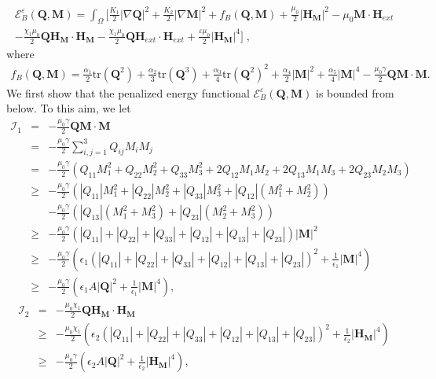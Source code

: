 \documentclass{article}
\def\Qvec{\mathbf{Q}}
\def \Mvec{\mathbf{M}}
\def\Hvec{\mathbf{H}}
\begin{document}
\begin{eqnarray}\label{penalized_energy}
\mathcal{E}^{\varepsilon}_B\left(\Qvec, \Mvec\right) = \int_{\Omega} \biggl[\frac{K_1}{2}|\nabla \Qvec|^2 + \frac{K_2}{2}|\nabla \Mvec|^2 + f_B\left(\Qvec, \Mvec\right) + \frac{\mu_0}{2}|\Hvec_{\Mvec}|^2 - \mu_0\Mvec\cdot \Hvec_{ext}\nonumber\\
- \frac{\chi_1\mu_0}{2}\Qvec\Hvec_{\Mvec}\cdot\Hvec_{\Mvec} - \frac{\chi_1\mu_0}{2}\Qvec\Hvec_{ext}\cdot\Hvec_{ext}+\frac{\varepsilon\mu_0}{2}|\Hvec_{\Mvec}|^4\bigg]\;, 
\end{eqnarray}
where
\begin{eqnarray}
f_B\left(\Qvec, \Mvec\right) = \frac{\alpha_1}{2}\mbox{tr}(\Qvec^2) + \frac{\alpha_2}{3}\mbox{tr}(\Qvec^3) + \frac{\alpha_3}{4}\mbox{tr}(\Qvec^2)^2 + \frac{\alpha_4}{2}|\Mvec|^2 + \frac{\alpha_5}{4}|\Mvec|^4 - \frac{\mu_0\gamma}{2}\Qvec\Mvec\cdot\Mvec.
\end{eqnarray}
We first show that the penalized energy functional $\mathcal{E}^{\varepsilon}_B\left(\Qvec, \Mvec\right)$ is bounded from below. To this aim, we let
\begin{eqnarray}
\mathcal{I}_1&=&  - \frac{\mu_0\gamma}{2}\Qvec\Mvec\cdot\Mvec\nonumber\\
&=& - \frac{\mu_0\gamma}{2}\sum_{i,j=1}^3 Q_{ij}M_iM_j\nonumber\\
&=& - \frac{\mu_0\gamma}{2}\left(Q_{11}M_1^2+Q_{22}M_2^2+Q_{33}M_3^2+2Q_{12}M_1M_2+2Q_{13}M_1M_3+2Q_{23}M_2M_3\right)\nonumber\\
&\ge& - \frac{\mu_0\gamma}{2}\left(|Q_{11}|M_1^2+|Q_{22}|M_2^2+|Q_{33}|M_3^2+|Q_{12}|\left(M_1^2+M_2^2\right)\right)\nonumber\\
& & - \frac{\mu_0\gamma}{2}\left(|Q_{13}|\left(M_1^2+M_3^2\right)+|Q_{23}|\left(M_2^2+M_3^2\right)\right)\nonumber\\
&\ge& - \frac{\mu_0\gamma}{2}\left(|Q_{11}|+|Q_{22}|+|Q_{33}|+|Q_{12}|+|Q_{13}|+|Q_{23}|\right)|\Mvec|^2\nonumber\\
&\ge& - \frac{\mu_0\gamma}{2}\left(\epsilon_1\left(|Q_{11}|+|Q_{22}|+|Q_{33}|+|Q_{12}|+|Q_{13}|+|Q_{23}|\right)^2+\frac{1}{\epsilon_1}|\Mvec|^4\right)\nonumber\\
&\ge& - \frac{\mu_0\gamma}{2}\left(\epsilon_1A|\Qvec|^2+\frac{1}{\epsilon_1}|\Mvec|^4\right),\label{lb:1}
\end{eqnarray}
\begin{eqnarray}
\mathcal{I}_2&=&  - \frac{\mu_0\chi_1}{2}\Qvec\Hvec_\Mvec\cdot\Hvec_\Mvec\nonumber\\
&\ge&  - \frac{\mu_0\chi_1}{2}\left(\epsilon_2\left(|Q_{11}|+|Q_{22}|+|Q_{33}|+|Q_{12}|+|Q_{13}|+|Q_{23}|\right)^2+\frac{1}{\epsilon_2}|\Hvec_\Mvec|^4\right)\nonumber\\
&\ge& - \frac{\mu_0\gamma}{2}\left(\epsilon_2A|\Qvec|^2+\frac{1}{\epsilon_2}|\Hvec_\Mvec|^4\right),\label{lb:2}
\end{eqnarray}
\end{document}
